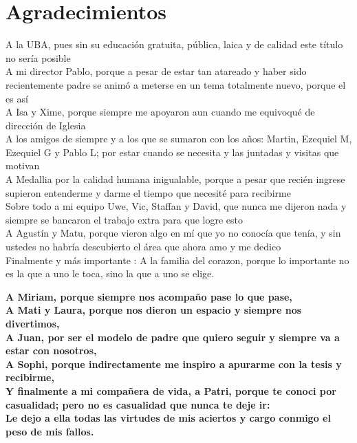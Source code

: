 
\bigskip

\begingroup
\let\clearpage\relax
\let\cleardoublepage\relax
\let\cleardoublepage\relax
\chapter*{Agradecimientos}

\begin{center}
A la UBA, pues sin su educaci\'on gratuita, p\'ublica, laica y de calidad este t\'itulo no ser\'ia posible \\
A mi director Pablo, porque a pesar de estar tan atareado y haber sido recientemente padre se anim\'o a meterse en un tema totalmente nuevo, porque el es as\'i \\
A Isa y Xime, porque siempre me apoyaron aun cuando me equivoqu\'e de direcci\'on de Iglesia \\
A los amigos de siempre y a los que se sumaron con los a\~nos: Martin, Ezequiel M, Ezequiel G y Pablo L; por estar cuando se necesita y las juntadas y visitas que motivan \\
A Medallia por la calidad humana inigualable, porque a pesar que reci\'en ingrese supieron entenderme y darme el tiempo que necesit\'e para recibirme \\
Sobre todo a mi equipo Uwe, Vic, Staffan y David, que nunca me dijeron nada y siempre se bancaron el trabajo extra para que logre esto \\
A Agust\'in y Matu, porque vieron algo en m\'i que yo no conoc\'ia que ten\'ia, y sin ustedes no habr\'ia descubierto el \'area que ahora amo y me dedico \\
Finalmente y m\'as importante : A la familia del corazon, porque lo importante no es la que a uno le toca, sino la que a uno se elige.
\linebreak
\linebreak

\textbf{
A Miriam, porque siempre nos acompa\~no pase lo que pase, \\
A Mati y Laura, porque nos dieron un espacio y siempre nos divertimos, \\
A Juan, por ser el modelo de padre que quiero seguir y siempre va a estar con nosotros, \\
A Sophi, porque indirectamente me inspiro a apurarme con la tesis y recibirme, \\
Y finalmente a mi compa\~nera de vida, a Patri, porque te conoci por casualidad; pero no es casualidad que nunca te deje ir: \\
Le dejo a ella todas las virtudes de mis aciertos y cargo conmigo el peso de mis fallos.
}
\end{center}
\endgroup




